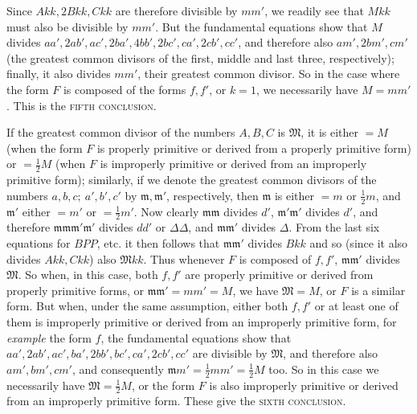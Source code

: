 Since $Akk,2Bkk,Ckk$ are therefore divisible by $mm'$, we readily see that $Mkk$ must also be divisible by $mm'$. But the fundamental equations show that $M$ divides $aa',\allowbreak 2ab',\allowbreak ac',\allowbreak 2ba',\allowbreak 4bb',\allowbreak 2bc',\allowbreak ca',\allowbreak 2cb',\allowbreak cc'$, and therefore also $am',2bm',cm'$ (the greatest common divisors of the first, middle and last three, respectively); finally, it also divides $mm'$, their greatest common divisor. So in the case where the form $F$ is composed of the forms $f,f'$, or $k=1$, we necessarily have $M=mm'$. This is the \textsc{fifth conclusion}.

If the greatest common divisor of the numbers $A,B,C$ is $\mathfrak{M}$, it is either $=M$ (when the form $F$ is properly primitive or derived from a properly primitive form) or $=\frac{1}{2}M$ (when $F$ is improperly primitive or derived from an improperly primitive form); similarly, if we denote the greatest common divisors of the numbers $a,b,c;\ a',b',c'$ by $\mathfrak{m},\mathfrak{m}'$, respectively, then $\mathfrak{m}$ is either $=m$ or $\frac{1}{2}m$, and $\mathfrak{m}'$ either $=m'$ or $=\frac{1}{2}m'$. Now clearly $\mathfrak{m}\mathfrak{m}$ divides $d'$, $\mathfrak{m}'\mathfrak{m}'$ divides $d'$, and therefore $\mathfrak{m}\mathfrak{m}\mathfrak{m}'\mathfrak{m}'$ divides $dd'$ or $\Delta\Delta$, and $\mathfrak{m}\mathfrak{m}'$ divides $\Delta$.
From the last six equations for $BPP$, etc. it then follows that $\mathfrak{m}\mathfrak{m}'$ divides $Bkk$ and so (since it also divides $Akk,Ckk$) also $\mathfrak{M}kk$. Thus whenever $F$ is composed of $f,f'$, $\mathfrak{m}\mathfrak{m}'$ divides $\mathfrak{M}$. So when, in this case, both $f,f'$ are properly primitive or derived from properly primitive forms, or $\mathfrak{m}\mathfrak{m}'=mm'=M$, we have $\mathfrak{M}=M$, or $F$ is a similar form. But when, under the same assumption, either both $f,f'$ or at least one of them is improperly primitive or derived from an improperly primitive form, for \textit{example} the form $f$, the fundamental equations show that $aa',2ab',ac',ba',2bb',bc',ca',2cb',cc'$ are divisible by $\mathfrak{M}$, and therefore also $am',bm',cm'$, and consequently $\mathfrak{m}m'=\frac{1}{2}mm'=\frac{1}{2}M$ too. So in this case we necessarily have $\mathfrak{M}=\frac{1}{2}M$, or the form $F$ is also improperly primitive or derived from an improperly primitive form. These give the \textsc{sixth conclusion}.

